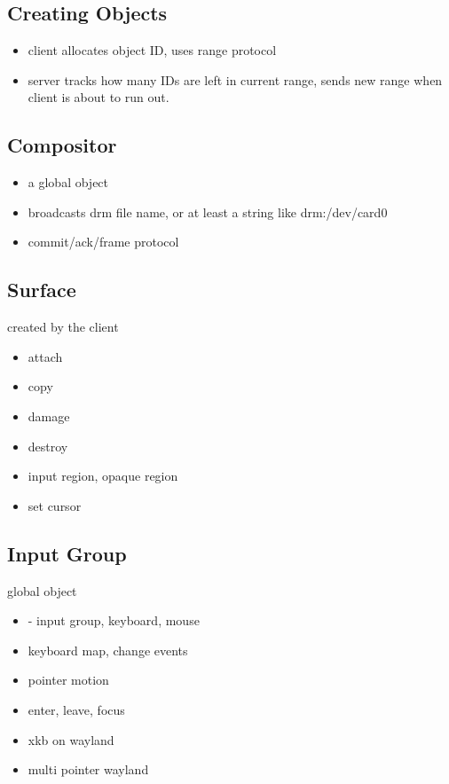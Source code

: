 \documentclass{article}
\begin{document}
\subsection{Creating Objects}

\begin{itemize}
\item client allocates object ID, uses range protocol
\item server tracks how many IDs are left in current range, sends new
  range when client is about to run out.
\end{itemize}

\subsection{Compositor}

\begin{itemize}
\item a global object
\item broadcasts drm file name, or at least a string like drm:/dev/card0
\item commit/ack/frame protocol
\end{itemize}

\subsection{Surface}

created by the client
\begin{itemize}
\item attach
\item copy
\item damage
\item destroy
\item input region, opaque region
\item set cursor
\end{itemize}

\subsection{Input Group}

global object

\begin{itemize}
\item - input group, keyboard, mouse
\item keyboard map, change events
\item pointer motion
\item enter, leave, focus
\item xkb on wayland
\item multi pointer wayland
\end{itemize}
\end{document}
